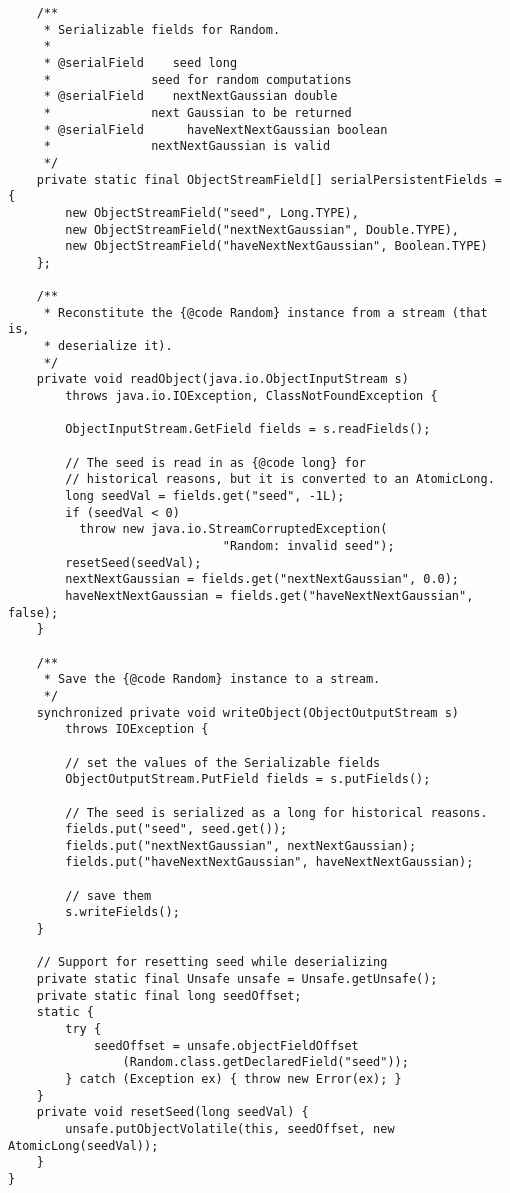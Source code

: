 \documentclass[12pt,a4paper,twoside,openright,titlepage,final]{article}
\begin{document}
\begin{verbatim}
    /**
     * Serializable fields for Random.
     *
     * @serialField    seed long
     *              seed for random computations
     * @serialField    nextNextGaussian double
     *              next Gaussian to be returned
     * @serialField      haveNextNextGaussian boolean
     *              nextNextGaussian is valid
     */
    private static final ObjectStreamField[] serialPersistentFields = {
        new ObjectStreamField("seed", Long.TYPE),
        new ObjectStreamField("nextNextGaussian", Double.TYPE),
        new ObjectStreamField("haveNextNextGaussian", Boolean.TYPE)
    };

    /**
     * Reconstitute the {@code Random} instance from a stream (that is,
     * deserialize it).
     */
    private void readObject(java.io.ObjectInputStream s)
        throws java.io.IOException, ClassNotFoundException {

        ObjectInputStream.GetField fields = s.readFields();

        // The seed is read in as {@code long} for
        // historical reasons, but it is converted to an AtomicLong.
        long seedVal = fields.get("seed", -1L);
        if (seedVal < 0)
          throw new java.io.StreamCorruptedException(
                              "Random: invalid seed");
        resetSeed(seedVal);
        nextNextGaussian = fields.get("nextNextGaussian", 0.0);
        haveNextNextGaussian = fields.get("haveNextNextGaussian", false);
    }

    /**
     * Save the {@code Random} instance to a stream.
     */
    synchronized private void writeObject(ObjectOutputStream s)
        throws IOException {

        // set the values of the Serializable fields
        ObjectOutputStream.PutField fields = s.putFields();

        // The seed is serialized as a long for historical reasons.
        fields.put("seed", seed.get());
        fields.put("nextNextGaussian", nextNextGaussian);
        fields.put("haveNextNextGaussian", haveNextNextGaussian);

        // save them
        s.writeFields();
    }

    // Support for resetting seed while deserializing
    private static final Unsafe unsafe = Unsafe.getUnsafe();
    private static final long seedOffset;
    static {
        try {
            seedOffset = unsafe.objectFieldOffset
                (Random.class.getDeclaredField("seed"));
        } catch (Exception ex) { throw new Error(ex); }
    }
    private void resetSeed(long seedVal) {
        unsafe.putObjectVolatile(this, seedOffset, new AtomicLong(seedVal));
    }
}
\end{verbatim}
\end{document}

